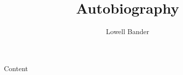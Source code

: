 \documentclass[]{article}
\begin{document}
\title{Autobiography}
\author{Lowell Bander}
\maketitle

Content
\end{document}
